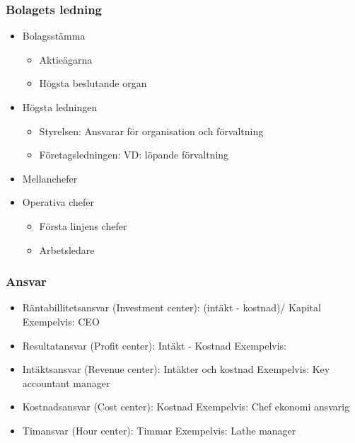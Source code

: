 \subsubsection{Bolagets ledning}
\begin{itemize}
    \item Bolagsstämma 
    \begin{itemize}
        \item Aktieägarna
        \item Högsta beslutande organ
    \end{itemize}
    \item Högsta ledningen
    \begin{itemize}
        \item Styrelsen: \newline
        Ansvarar för organisation och förvaltning
        \item Företagsledningen: \newline
        VD: löpande förvaltning
    \end{itemize}
    \item Mellanchefer
    \item Operativa chefer
    \begin{itemize}
        \item Första linjens chefer 
        \item Arbetsledare
    \end{itemize}
\end{itemize}

\subsubsection{Ansvar}
\begin{itemize}
    \item Räntabillitetsansvar (Investment center): (intäkt - kostnad)/ Kapital \newline
    Exempelvis: CEO
    \item Resultatansvar (Profit center): Intäkt - Kostnad \newline
    Exempelvis: 
    \item Intäktsansvar (Revenue center): Intäkter och kostnad \newline
    Exempelvis: Key accountant manager
    \item Kostnadsansvar (Cost center): Kostnad  \newline
    Exempelvis: Chef ekonomi ansvarig
    \item Timansvar (Hour center): Timmar \newline
    Exempelvis: Lathe manager
\end{itemize}

